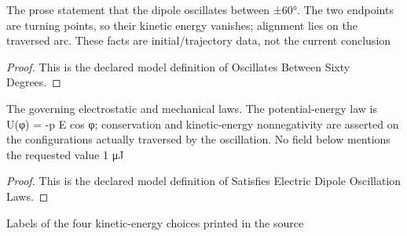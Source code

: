 \begin{definition}
  \label{def:physics:phyx-mini-0856:phyxminiproblems-problemphyxmini0856-oscillatesbetweensixtydegrees}
  The prose statement that the dipole oscillates between ±60°. The two endpoints are turning points, so their kinetic energy vanishes; alignment lies on the traversed arc. These facts are initial/trajectory data, not the current conclusion
\end{definition}
\begin{proof}
  This is the declared model definition of Oscillates Between Sixty Degrees.
\end{proof}
\begin{definition}
  \label{def:physics:phyx-mini-0856:phyxminiproblems-problemphyxmini0856-satisfieselectricdipoleoscillationlaws}
  The governing electrostatic and mechanical laws. The potential-energy law is U(φ) = -p E cos φ; conservation and kinetic-energy nonnegativity are asserted on the configurations actually traversed by the oscillation. No field below mentions the requested value 1 μJ
\end{definition}
\begin{proof}
  This is the declared model definition of Satisfies Electric Dipole Oscillation Laws.
\end{proof}
\begin{definition}
  \label{def:physics:phyx-mini-0856:phyxminiproblems-problemphyxmini0856-answerchoice}
  Labels of the four kinetic-energy choices printed in the source
\end{definition}
